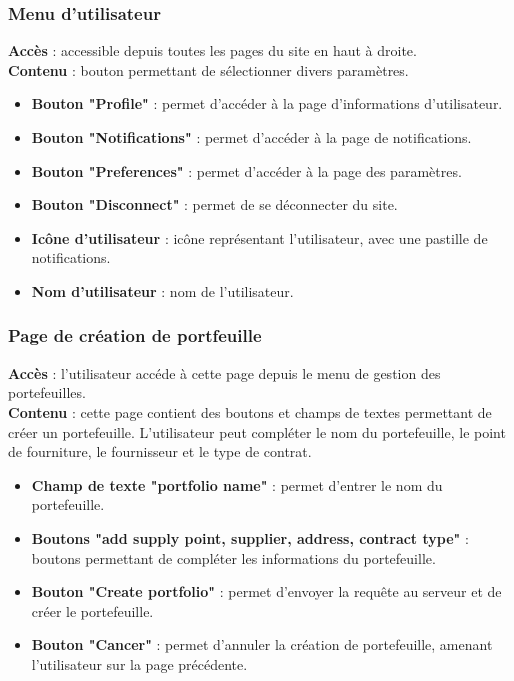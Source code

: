 \documentclass[../rapport.tex]{subfiles}
\begin{document}
\subsubsection{Menu d'utilisateur}
\noindent \textbf{Accès} : accessible depuis toutes les pages du site en haut à droite. \\
\textbf{Contenu} : bouton permettant de sélectionner divers paramètres. 
\begin{itemize}
    \item \textbf{Bouton "Profile"} : permet d'accéder à la page d'informations d'utilisateur.
    \item \textbf{Bouton "Notifications"} : permet d'accéder à la page de notifications.
    \item \textbf{Bouton "Preferences"} : permet d'accéder à la page des paramètres.
    \item \textbf{Bouton "Disconnect"} : permet de se déconnecter du site.
    \item \textbf{Icône d'utilisateur} : icône représentant l'utilisateur, avec une pastille de notifications. 
    \item \textbf{Nom d'utilisateur} : nom de l'utilisateur.
\end{itemize}

\subsubsection{Page de création de portfeuille}
\noindent \textbf{Accès} : l'utilisateur accéde à cette page depuis le menu de gestion des portefeuilles.\\
\textbf{Contenu} : cette page contient des boutons et champs de textes permettant de créer un portefeuille. L'utilisateur peut compléter le nom du portefeuille, le point de fourniture, le fournisseur et le type de contrat.
\begin{itemize}
    \item \textbf{Champ de texte "portfolio name"} : permet d'entrer le nom du portefeuille. 
    \item \textbf{Boutons "add supply point, supplier, address, contract type"} : boutons permettant de compléter les informations du portefeuille. 
    \item \textbf{Bouton "Create portfolio"} : permet d'envoyer la requête au serveur et de créer le portefeuille. 
    \item \textbf{Bouton "Cancer"} : permet d'annuler la création de portefeuille, amenant l'utilisateur sur la page précédente.
\end{itemize}
\end{document}
